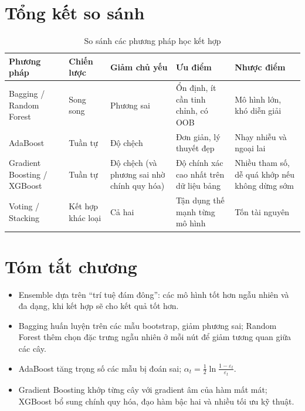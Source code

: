 \section{Tổng kết so sánh}

\begin{table}[H]
\centering
\small
\begin{tabular}{|p{2.4cm}|p{2.2cm}|p{2.4cm}|p{3.2cm}|p{3cm}|}
\hline
\textbf{Phương pháp} & \textbf{Chiến lược} & \textbf{Giảm chủ yếu} & \textbf{Ưu điểm} & \textbf{Nhược điểm} \\
\hline
Bagging / Random Forest & Song song & Phương sai & Ổn định, ít cần tinh chỉnh, có OOB & Mô hình lớn, khó diễn giải \\ \hline
AdaBoost & Tuần tự & Độ chệch & Đơn giản, lý thuyết đẹp & Nhạy nhiễu và ngoại lai \\ \hline
Gradient Boosting / XGBoost & Tuần tự & Độ chệch (và phương sai nhờ chính quy hóa) & Độ chính xác cao nhất trên dữ liệu bảng & Nhiều tham số, dễ quá khớp nếu không dừng sớm \\ \hline
Voting / Stacking & Kết hợp khác loại & Cả hai & Tận dụng thế mạnh từng mô hình & Tốn tài nguyên \\ \hline
\end{tabular}
\caption{So sánh các phương pháp học kết hợp}
\end{table}

\section{Tóm tắt chương}
\begin{itemize}
    \item Ensemble dựa trên ``trí tuệ đám đông'': các mô hình tốt hơn ngẫu nhiên và đa dạng, khi kết hợp sẽ cho kết quả tốt hơn.
    \item Bagging huấn luyện trên các mẫu bootstrap, giảm phương sai; Random Forest thêm chọn đặc trưng ngẫu nhiên ở mỗi nút để giảm tương quan giữa các cây.
    \item AdaBoost tăng trọng số các mẫu bị đoán sai; $\alpha_t = \frac{1}{2}\ln\frac{1 - \varepsilon_t}{\varepsilon_t}$.
    \item Gradient Boosting khớp từng cây với gradient âm của hàm mất mát; XGBoost bổ sung chính quy hóa, đạo hàm bậc hai và nhiều tối ưu kỹ thuật.
\end{itemize}

